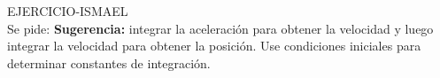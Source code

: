 

  
 \begin{multicols}{2}
    \begin{excercise}[][][]{}{
        EJERCICIO-ISMAEL\\
        Se pide:
        \textbf{Sugerencia:} integrar la aceleración para obtener la velocidad y luego integrar la velocidad para obtener la posición. Use condiciones iniciales para determinar constantes de integración.
        }
    \end{excercise}
 \end{multicols}
